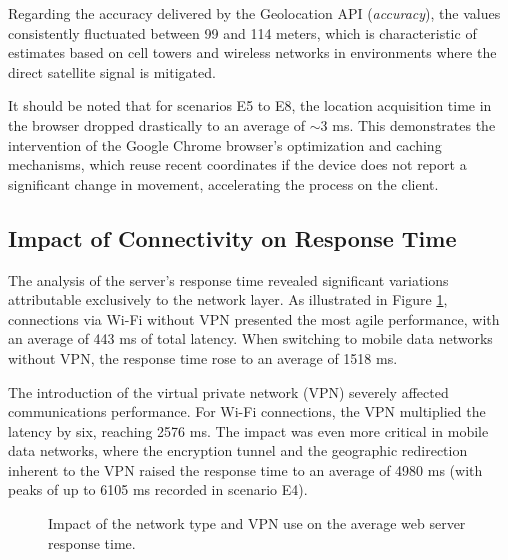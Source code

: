 \documentclass[runningheads]{llncs}
\begin{document}
Regarding the accuracy delivered by the Geolocation API (\textit{accuracy}), the values consistently fluctuated between 99 and 114 meters, which is characteristic of estimates based on cell towers and wireless networks in environments where the direct satellite signal is mitigated. 

It should be noted that for scenarios E5 to E8, the location acquisition time in the browser dropped drastically to an average of $\sim$3 ms. This demonstrates the intervention of the Google Chrome browser's optimization and caching mechanisms, which reuse recent coordinates if the device does not report a significant change in movement, accelerating the process on the client.

\subsection{Impact of Connectivity on Response Time}
The analysis of the server's response time revealed significant variations attributable exclusively to the network layer. As illustrated in Figure \ref{fig:tiempo_respuesta}, connections via Wi-Fi without VPN presented the most agile performance, with an average of 443 ms of total latency. When switching to mobile data networks without VPN, the response time rose to an average of 1518 ms.

The introduction of the virtual private network (VPN) severely affected communications performance. For Wi-Fi connections, the VPN multiplied the latency by six, reaching 2576 ms. The impact was even more critical in mobile data networks, where the encryption tunnel and the geographic redirection inherent to the VPN raised the response time to an average of 4980 ms (with peaks of up to 6105 ms recorded in scenario E4).

\begin{figure}[htbp]
    \centering
    \caption{Impact of the network type and VPN use on the average web server response time.}
    \label{fig:tiempo_respuesta}
\end{figure}
\end{document}
